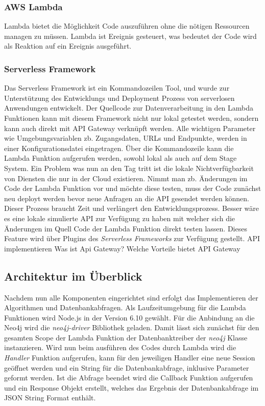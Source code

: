 \subsubsection{AWS Lambda}

Lambda bietet die Möglichkeit Code auszuführen ohne die nötigen Ressourcen managen zu müssen. Lambda ist Ereignis gesteuert, was bedeutet der Code wird als Reaktion auf ein Ereignis ausgeführt. 
\subsubsection{Serverless Framework}
Das Serverless Framework ist ein Kommandozeilen Tool, und wurde zur Unterstützung des Entwicklungs und Deployment Prozess von serverlosen Anwendungen entwickelt. 
Der Quellcode zur Datenverarbeitung in den Lambda Funktionen kann mit diesem Framework nicht nur lokal getestet werden, sondern kann auch direkt mit API Gateway verknüpft werden. Alle wichtigen Parameter wie Umgebungsvariablen zb. Zugangsdaten, URLs und Endpunkte, werden in einer Konfigurationsdatei eingetragen.  Über die Kommandozeile kann die Lambda Funktion aufgerufen werden, sowohl lokal als auch auf dem Stage System. 
Ein Problem was nun an den Tag tritt ist die lokale Nichtverfügbarkeit von Diensten die nur in der Cloud existieren. Nimmt man zb. Änderungen im Code der Lambda Funktion vor und möchte diese testen, muss der Code zunächst neu deployt werden bevor neue Anfragen an die API gesendet werden können. Dieser Prozess braucht Zeit und verlängert den Entwicklungsprozess. Besser wäre es eine lokale simulierte API zur Verfügung zu haben mit welcher sich die Änderungen im Quell Code der Lambda Funktion direkt testen lassen. Dieses Feature wird über Plugins des \textit{Serverless Frameworks} zur Verfügung gestellt.
API implementieren
Was ist Api Gateway?
Welche Vorteile bietet API Gateway


\subsection{Architektur im Überblick}

Nachdem nun alle Komponenten eingerichtet sind erfolgt das Implementieren der Algorithmen und Datenbankabfragen. Als Laufzeitumgebung für die Lambda Funktionen wird Node.js in der Version 6.10 gewählt. Für die Anbindung an die Neo4j wird die \textit{neo4j-driver} Bibliothek geladen. Damit lässt sich zunächst für den gesamten Scope der Lambda Funktion der Datenbanktreiber der \textit{neo4j} Klasse instanzieren. 
Wird nun beim ausführen des Codes durch Lambda wird die \textit{Handler} Funktion aufgerufen, kann für den jeweiligen Handler eine neue Session geöffnet werden und ein String für die Datenbankabfrage, inklusive Parameter geformt werden. Ist die Abfrage beendet wird die Callback Funktion aufgerufen und ein Response Objekt erstellt, welches das Ergebnis der Datenbankabfrage im JSON String Format enthält.

